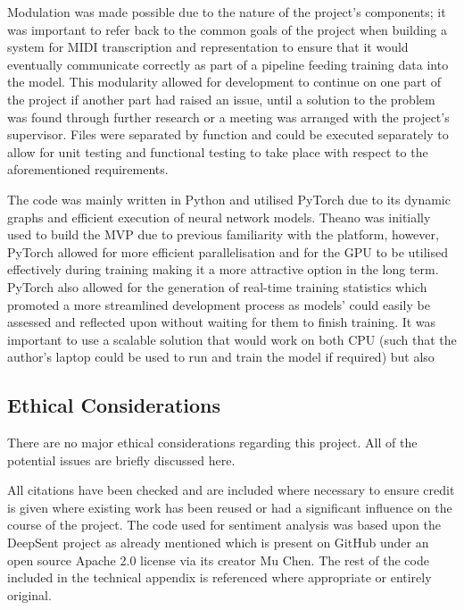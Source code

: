 \documentclass[12pt,]{article}
\begin{document}
Modulation was made possible due to the nature of the project's
components; it was important to refer back to the common goals of the
project when building a system for MIDI transcription and representation
to ensure that it would eventually communicate correctly as part of a
pipeline feeding training data into the model. This modularity allowed
for development to continue on one part of the project if another part
had raised an issue, until a solution to the problem was found through
further research or a meeting was arranged with the project's
supervisor. Files were separated by function and could be executed
separately to allow for unit testing and functional testing to take
place with respect to the aforementioned requirements.

The code was mainly written in Python and utilised PyTorch due to its
dynamic graphs and efficient execution of neural network models. Theano
was initially used to build the MVP due to previous familiarity with the
platform, however, PyTorch allowed for more efficient parallelisation
and for the GPU to be utilised effectively during training making it a
more attractive option in the long term. PyTorch also allowed for the
generation of real-time training statistics which promoted a more
streamlined development process as models' could easily be assessed and
reflected upon without waiting for them to finish training. It was
important to use a scalable solution that would work on both CPU (such
that the author's laptop could be used to run and train the model if
required) but also

\hypertarget{ethical-considerations}{%
\subsection{Ethical Considerations}\label{ethical-considerations}}

There are no major ethical considerations regarding this project. All of
the potential issues are briefly discussed here.

All citations have been checked and are included where necessary to
ensure credit is given where existing work has been reused or had a
significant influence on the course of the project. The code used for
sentiment analysis was based upon the DeepSent project as already
mentioned which is present on GitHub under an open source Apache 2.0
license via its creator Mu Chen. The rest of the code included in the
technical appendix is referenced where appropriate or entirely original.
\end{document}
